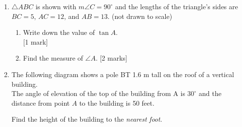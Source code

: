 \documentclass[12pt, twoside]{article}
\begin{document}
\begin{enumerate}
\item $\triangle ABC$ is shown with $m\angle C=90^\circ$ and the lengths of the triangle's sides are $BC=5$, $AC=12$, and $AB=13$. (not drawn to scale)
  \begin{multicols}{2}
        \begin{enumerate}
        \item Write down the value of $\tan A$.  \\ \hfill [1 mark]\vspace{0.5cm}
        \item Find the measure of $\angle A$.  \hfill [2 marks] \vspace{1cm}
      \end{enumerate}
    \end{multicols} \vspace{2cm}

\item The following diagram shows a pole BT 1.6 m tall on the roof of a vertical building. \\[0.25cm]
  The angle of elevation of the top of the building from A is  
  $30^\circ$ and the distance from point $A$ to the building is 50 feet. 
    \begin{center}
      \end{center}
      Find the height of the building to the \emph{nearest foot}.

\end{enumerate}
\end{document}
